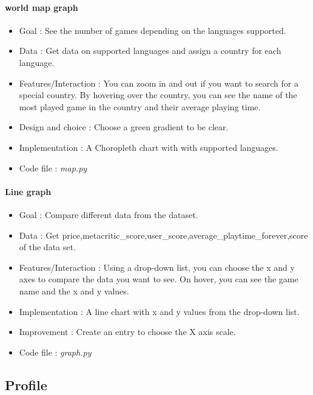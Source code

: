 \documentclass{article}
\begin{document}
    \paragraph{world map graph}
    \begin{itemize}
        \item Goal : See the number of games depending on the languages supported.
        \item Data : Get data on supported languages and assign a country for each language.
        \item Features/Interaction : You can zoom in and out if you want to search for a special country. By hovering over the country, you can see the name of the most played game in the country and their average playing time.
        \item Design and choice : Choose a green gradient to be clear.
        \item Implementation : A Choropleth chart with with supported languages.
        \item Code file : \textit{map.py}
    \end{itemize}
    
    \paragraph{Line graph}
    \begin{itemize}
        \item Goal : Compare different data from the dataset.
        \item Data : Get price,metacritic\_score,user\_score,average\_playtime\_forever,score of the data set.
        \item Features/Interaction : Using a drop-down list, you can choose the x and y axes to compare the data you want to see. On hover, you can see the game name and the x and y values.
        \item Implementation : A line chart with x and y values from the drop-down list.
        \item Improvement : Create an entry to choose the X axis scale.
        \item Code file : \textit{graph.py}
    \end{itemize}

	\subsection{Profile}
    
\end{document}
